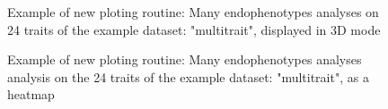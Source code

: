 	\begin{figure}[ht]
	  \hfill
	  \caption{Example of new ploting routine: Many endophenotypes analyses on 24 traits of the example dataset: "multitrait", displayed in 3D mode}
	  \label{fig:FigureThreeD}
	\end{figure}
	
	\begin{figure}[ht]  
	  \hfill
	  \caption{Example of new ploting routine: Many endophenotypes analyses analysis on the 24 traits of the example dataset: "multitrait", as a heatmap}
	  \label{fig:FigureHeat}    
	\end{figure}
	
